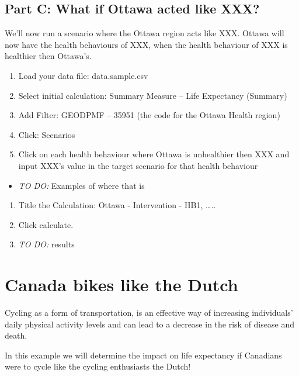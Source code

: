 \documentclass[]{book}
\providecommand{\tightlist}{%
  \setlength{\itemsep}{0pt}\setlength{\parskip}{0pt}}
\begin{document}
\hypertarget{part-c-what-if-ottawa-acted-like-xxx}{%
\subsection{Part C: What if Ottawa acted like XXX?}\label{part-c-what-if-ottawa-acted-like-xxx}}

We'll now run a scenario where the Ottawa region acts like XXX. Ottawa will now have the health behaviours of XXX, when the health behaviour of XXX is healthier then Ottawa's.

\begin{enumerate}
\def\labelenumi{\arabic{enumi}.}
\item
  Load your data file: data.sample.csv
\item
  Select initial calculation: Summary Measure -- Life Expectancy (Summary)
\item
  Add Filter: GEODPMF -- 35951 (the code for the Ottawa Health region)
\item
  Click: Scenarios
\item
  Click on each health behaviour where Ottawa is unhealthier then XXX and input XXX's value in the target scenario for that health behaviour
\end{enumerate}

\begin{itemize}
\tightlist
\item
  \emph{TO DO: } Examples of where that is
\end{itemize}

\begin{enumerate}
\def\labelenumi{\arabic{enumi}.}
\setcounter{enumi}{5}
\item
  Title the Calculation: Ottawa - Intervention - HB1, \ldots{}..
\item
  Click calculate.
\item
  \emph{TO DO:} results
\end{enumerate}

\hypertarget{canada-bikes-like-the-dutch}{%
\section{Canada bikes like the Dutch}\label{canada-bikes-like-the-dutch}}

Cycling as a form of transportation, is an effective way of increasing individuals' daily physical activity levels and can lead to a decrease in the risk of disease and death.

In this example we will determine the impact on life expectancy if Canadians were to cycle like the cycling enthusiasts the Dutch!
\end{document}
